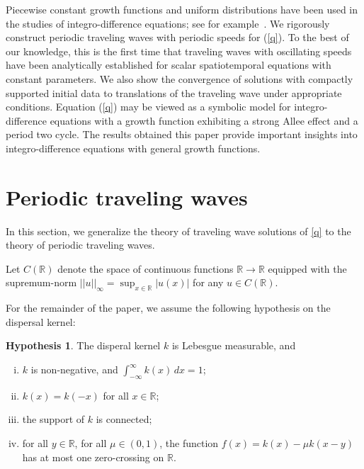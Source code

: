 \documentclass[11pt]{article}
\theoremstyle{definition}
\newtheorem{hyp}[thm]{Hypothesis}
\numberwithin{equation}{section}
\numberwithin{thm}{section}
\begin{document}
Piecewise constant growth functions and uniform distributions have been used in the studies of integro-difference equations; see for example~\cite{kot1, lut,otto,  pnas}. We rigorously construct periodic traveling waves with periodic speeds for (\ref{q}). To the best of our knowledge, this is the first time that traveling waves with oscillating speeds have been analytically established  for scalar spatiotemporal equations with constant parameters. We also show the convergence of solutions with compactly supported initial data to translations of the traveling wave under appropriate conditions. Equation (\ref{q}) may be viewed as a symbolic model for integro-difference equations with a growth function exhibiting a strong Allee effect and a period two cycle. The results obtained this paper provide important insights into integro-difference equations with general growth functions. 


\section{Periodic traveling waves}

In this section, we generalize the theory of traveling wave solutions of \ref{q} to the theory of periodic traveling waves.

Let $C(\mathbb R)$ denote the space of continuous functions $\mathbb R\to\mathbb R$ equipped with the supremum-norm $||u||_\infty=\sup_{x\in\mathbb R}|u(x)|$ for any $u\in C(\mathbb R)$.

For the remainder of the paper, we assume the following hypothesis on the dispersal kernel:

\def\Hone{(\text{H1})}
\def\Htwo{(\text{H2})}
\def\Hthree{(\text{H3})}
\def\Hfour{(\text{H4})}

\begin{hyp} \label{hypothesis1} The disperal kernel $k$ is Lebesgue measurable, and

\begin{enumerate}[i.)]
\item $k$ is non-negative, and $\int_{-\infty}^{\infty} k(x) \, dx = 1$;

\item $k(x)=k(-x)$ for all $x\in\mathbb R$;

\item the support of $k$ is connected;

\item  for all $y\in\mathbb R$, for all $\mu\in(0,1)$, the function $f(x)= k(x)-\mu k(x-y)$ has at most one zero-crossing on $\mathbb R$.
\end{enumerate}
\end{hyp}
\end{document}
